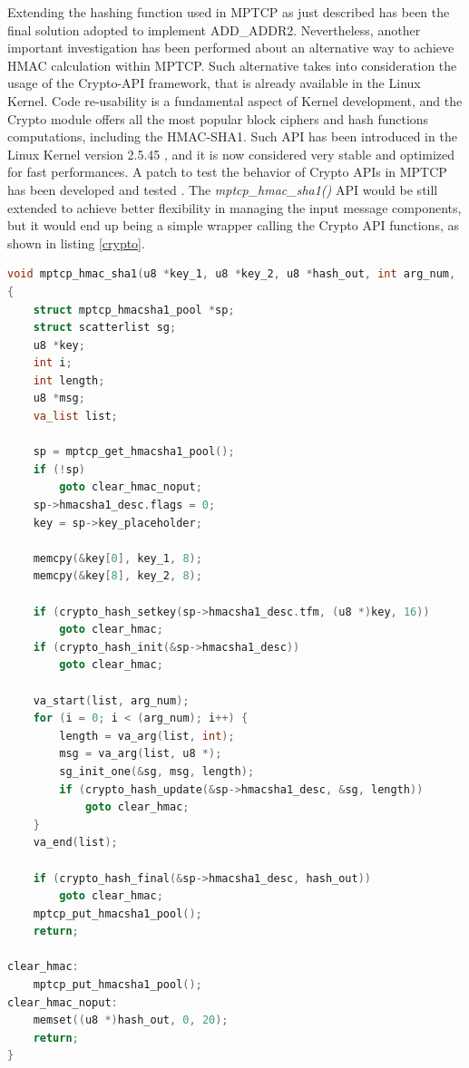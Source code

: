 Extending the hashing function used in MPTCP as just described has been the final solution adopted to implement ADD\_ADDR2. Nevertheless, another important investigation has been performed about an alternative way to achieve HMAC calculation within MPTCP. Such alternative takes into consideration the usage of the Crypto-API framework, that is already available in the Linux Kernel. Code re-usability is a fundamental aspect of Kernel development, and the Crypto module offers all the most popular block ciphers and hash functions computations, including the HMAC-SHA1. Such API has been introduced in the Linux Kernel version 2.5.45 \cite{cryptoinkernel}, and it is now considered very stable and optimized for fast performances. 
A patch to test the behavior of Crypto APIs in MPTCP has been developed and tested \cite{cryptopatch1} \cite{cryptopatch2}. The \textit{mptcp\_hmac\_sha1()} API would be still extended to achieve better flexibility in managing the input message components, but it would end up being a simple wrapper calling the Crypto API functions, as shown in listing \ref{crypto}.

\begin{lstlisting}[language=c, caption=\textit{\textit{mptcp\_hmac\_sha1() using Linux kernel Crypto API}}, label=crypto]
void mptcp_hmac_sha1(u8 *key_1, u8 *key_2, u8 *hash_out, int arg_num, ...)
{
	struct mptcp_hmacsha1_pool *sp;
	struct scatterlist sg;
	u8 *key;
	int i;
	int length;
	u8 *msg;
	va_list list;

	sp = mptcp_get_hmacsha1_pool();
	if (!sp)
		goto clear_hmac_noput;
	sp->hmacsha1_desc.flags = 0;
	key = sp->key_placeholder;

	memcpy(&key[0], key_1, 8);
	memcpy(&key[8], key_2, 8);

	if (crypto_hash_setkey(sp->hmacsha1_desc.tfm, (u8 *)key, 16))
		goto clear_hmac;
	if (crypto_hash_init(&sp->hmacsha1_desc))
		goto clear_hmac;

	va_start(list, arg_num);
	for (i = 0; i < (arg_num); i++) {
		length = va_arg(list, int);
		msg = va_arg(list, u8 *);
		sg_init_one(&sg, msg, length);
		if (crypto_hash_update(&sp->hmacsha1_desc, &sg, length))
			goto clear_hmac;
	}
	va_end(list);

	if (crypto_hash_final(&sp->hmacsha1_desc, hash_out))
		goto clear_hmac;
	mptcp_put_hmacsha1_pool();
	return;

clear_hmac:
	mptcp_put_hmacsha1_pool();
clear_hmac_noput:
	memset((u8 *)hash_out, 0, 20);
	return;
}
\end{lstlisting}

